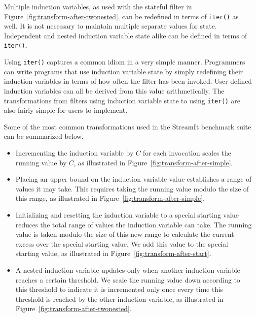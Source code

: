 Multiple induction variables, as used with the stateful filter in Figure~\ref{fig:transform-after-twonested}, can be redefined in terms of {\tt iter()} as well.  It is not necessary to maintain multiple separate values for state.  Independent and nested induction variable state alike can be defined in terms of {\tt iter()}.

Using {\tt iter()} captures a common idiom in a very simple manner.  Programmers can write programs that use induction variable state by simply redefining their induction variables in terms of how often the filter has been invoked.  User defined induction variables can all be derived from this value arithmetically.  The transformations from filters using induction variable state to using {\tt iter()} are also fairly simple for users to implement.  

Some of the most common transformations used in the StreamIt benchmark suite can be summarized below.  
\begin{itemize}
\item Incrementing the induction variable by $C$ for each invocation scales the running value by $C$, as illustrated in Figure~\ref{fig:transform-after-simple}.

\item Placing an upper bound on the induction variable value establishes a range of values it may take.  This requires taking the running value modulo the size of this range, as illustrated in Figure~\ref{fig:transform-after-simple}.

\item Initializing and resetting the induction variable to a special starting value reduces the total range of values the induction variable can take.  The running value is taken modulo the size of this new range to calculate the current excess over the special starting value.  We add this value to the special starting value, as illustrated in Figure~\ref{fig:transform-after-start}.

\item A nested induction variable updates only when another induction variable reaches a certain threshold.  We scale the running value down according to this threshold to indicate it is incremented only once every time this threshold is reached by the other induction variable, as illustrated in Figure~\ref{fig:transform-after-twonested}.
\end{itemize}

